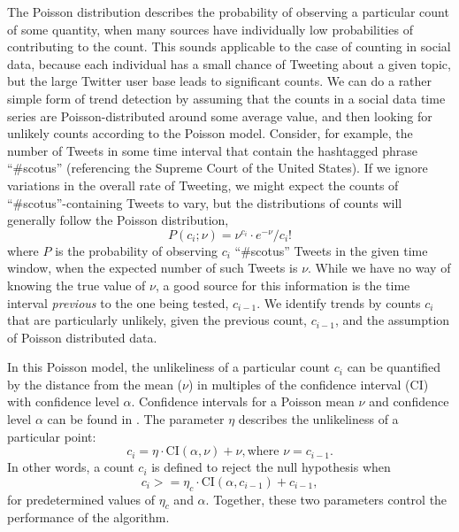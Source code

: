 \documentclass{article}
\begin{document}
The Poisson distribution describes the probability of observing a particular
count of some quantity, when many sources have individually low probabilities
of contributing to the count. This sounds applicable to the case of counting in
social data, because each individual has a small chance of Tweeting about a
given topic, but the large Twitter user base leads to significant counts. We
can do a rather simple form of trend detection by assuming that the counts in a
social data time series are Poisson-distributed around some average value, and
then looking for unlikely counts according to the Poisson model. Consider, for example,
the number of Tweets in some time interval that contain the hashtagged phrase ``\#scotus''
(referencing the Supreme Court of the United States).
If we ignore variations in the overall rate of Tweeting, we might expect the
counts of ``\#scotus''-containing Tweets to vary, but the distributions of counts
will generally follow the Poisson distribution,
\begin{equation}
    P(c_i;\nu) = \nu^{c_i}\cdot e^{-\nu} / c_i!
\end{equation}
where $P$ is the probability of observing $c_i$ ``\#scotus'' Tweets in the given time
window, when the expected number of such Tweets is $\nu$. While we have no way of
knowing the true value of $\nu$, a good source for this information is the time interval \textit{previous} to the
one being tested, $c_{i-1}$. We identify trends by counts $c_i$ that are particularly
unlikely, given the previous count, $c_{i-1}$, and the assumption of Poisson
distributed data. 

In this Poisson model, the unlikeliness of a particular count $c_i$ can be
quantified by the distance from the mean ($\nu$) in multiples of the confidence 
interval (CI) with confidence level $\alpha$. Confidence intervals for a Poisson mean $\nu$ and
confidence level $\alpha$ can be found in \cite{George:2012}. 
The parameter $\eta$ describes the unlikeliness of a particular point:
\begin{equation}
    c_i = \eta \cdot \textrm{CI}(\alpha, \nu) + \nu, \textrm{where } \nu = c_{i-1}.
\end{equation}
In other words, a count $c_i$ is defined to
reject the null hypothesis when
\begin{equation}
    c_i >= \eta_c \cdot \textrm{CI}(\alpha, c_{i-1}) + c_{i-1},
\end{equation}
for predetermined values of $\eta_c$ and $\alpha$. Together, these two parameters
control the performance of the algorithm. 
\end{document}
